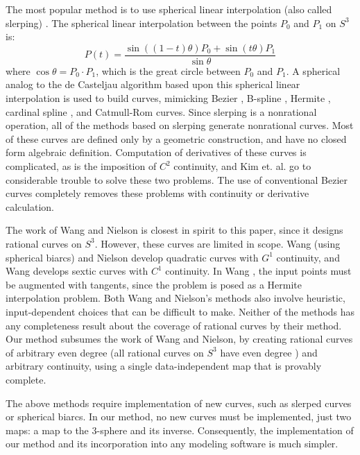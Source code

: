 The most popular method is to use spherical linear interpolation 
(also called slerping) 
\cite{shoemake85,duff85,pletinckx89,schlag91,nielson92,nielson93,kim95,nam95}.
The spherical linear interpolation between the points $P_0$ and $P_1$ on $S^3$ is:
\[ P(t) = \frac{\sin((1-t)\theta) P_0 + \sin(t \theta) P_1}{\sin \theta}
\]
where $\cos \theta = P_0 \cdot P_1$, which is the great circle between $P_0$ and $P_1$.
A spherical analog to the de Casteljau algorithm based upon this
spherical linear interpolation is used to build curves,
mimicking Bezier \cite{shoemake85,kim95}, B-spline 
\cite{duff85,nielson92,nielson93,kim95}, Hermite \cite{kim95,nam95},
cardinal spline \cite{pletinckx89}, and Catmull-Rom \cite{schlag91} curves.
Since slerping is a nonrational operation,
all of the methods based on slerping generate nonrational curves.
Most of these curves are defined only by a geometric construction, and have
no closed form algebraic definition.
Computation of derivatives of these curves is complicated,
as is the imposition of $C^2$ continuity, and
Kim et. al. \cite{kim95} go to considerable trouble to solve these two problems.
The use of conventional Bezier curves completely removes 
these problems with continuity or derivative calculation.

The work of Wang \cite{wang93, wang95} and Nielson \cite{nielson93}
is closest in spirit to this paper, since it designs rational curves on $S^3$.
However, these curves are limited in scope.
Wang \cite{wang93,wang95} (using spherical biarcs) 
and Nielson \cite{nielson93} develop quadratic curves
with $G^1$ continuity, and Wang \cite{wang95} develops sextic curves
with $C^1$ continuity.
In Wang \cite{wang93,wang95}, the input points must be augmented with 
tangents, since the problem is posed as a Hermite interpolation problem.
Both Wang and Nielson's methods also involve heuristic, input-dependent choices 
that can be difficult to make.
Neither of the methods has any completeness result about the
coverage of rational curves by their method.
Our method subsumes the work of Wang and Nielson, 
by creating rational curves of arbitrary
even degree (all rational curves on $S^3$ have even degree \cite{wang95}) 
and arbitrary continuity, using a single data-independent map that is provably complete.

The above methods require implementation of new curves,
such as slerped curves or spherical biarcs.
In our method, no new curves must be implemented, just two maps:
a map to the 3-sphere and its inverse.
Consequently, the implementation of our method and its incorporation
into any modeling software is much simpler.

